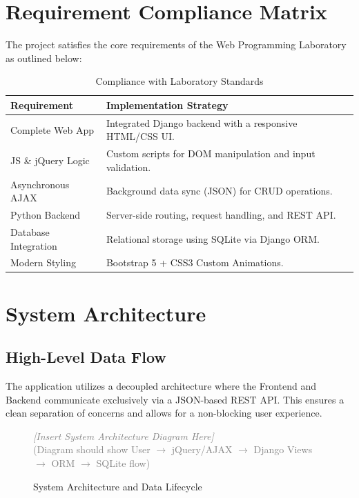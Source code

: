 \documentclass[11pt,a4paper]{article}
\begin{document}
\section{Requirement Compliance Matrix}
The project satisfies the core requirements of the Web Programming Laboratory as outlined below:

\begin{table}[h]
    \centering
    \begin{tabular}{@{}ll@{}}
        \toprule
        \textbf{Requirement} & \textbf{Implementation Strategy} \\ \midrule
        Complete Web App & Integrated Django backend with a responsive HTML/CSS UI. \\
        JS \& jQuery Logic & Custom scripts for DOM manipulation and input validation. \\
        Asynchronous AJAX & Background data sync (JSON) for CRUD operations. \\
        Python Backend & Server-side routing, request handling, and REST API. \\
        Database Integration & Relational storage using SQLite via Django ORM. \\
        Modern Styling & Bootstrap 5 + CSS3 Custom Animations. \\ \bottomrule
    \end{tabular}
    \caption{Compliance with Laboratory Standards}
\end{table}

\section{System Architecture}
\subsection{High-Level Data Flow}
The application utilizes a decoupled architecture where the Frontend and Backend communicate exclusively via a JSON-based REST API. This ensures a clean separation of concerns and allows for a non-blocking user experience.

\begin{figure}[h]
    \centering
    \vspace{1cm}
    \begin{tcolorbox}[colframe=lightgray, colback=white, boxrule=1pt, height=6.5cm, center]
        \centering \vspace{2.5cm} 
        \textcolor{gray}{\textit{[Insert System Architecture Diagram Here]}} \\
        \small \textcolor{gray}{(Diagram should show User $\rightarrow$ jQuery/AJAX $\rightarrow$ Django Views $\rightarrow$ ORM $\rightarrow$ SQLite flow)}
    \end{tcolorbox}
    \caption{System Architecture and Data Lifecycle}
    \label{fig:architecture}
\end{figure}
\end{document}
